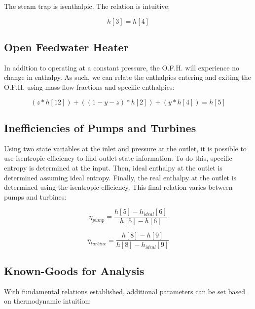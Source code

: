 \documentclass[10pt,cleanfoot]{asme2ej}
\begin{document}
The steam trap is isenthalpic. The relation is intuitive:

\begin{equation}
h[3] = h[4]
\label{Isobaric device}
\end{equation}

\subsection{Open Feedwater Heater}

In addition to operating at a constant pressure, the O.F.H. will experience no change in enthalpy. As such, we can relate the enthalpies entering and exiting the O.F.H. using mass flow fractions and specific enthalpies:

\begin{equation}
(z * h[12]) + ((1-y-z) * h[2]) + (y * h[4]) = h[5]
\label{O.F.H. enthalpies}
\end{equation}

\subsection{Inefficiencies of Pumps and Turbines}

Using two state variables at the inlet and pressure at the outlet, it is possible to use isentropic efficiency to find outlet state information. To do this, specific entropy is determined at the input. Then, ideal enthalpy at the outlet is determined assuming ideal entropy. Finally, the real enthalpy at the outlet is determined using the isentropic efficiency. This final relation varies between pumps and turbines:

\begin{equation}
\eta_{pump} = \frac{h[5] - h_{ideal}[6]}{h[5] - h[6]}
\label{Pump entropy}
\end{equation}

\begin{equation}
\eta_{turbine} = \frac{h[8] - h[9]}{h[8] - h_{ideal}[9]}
\label{Turbine entropy}
\end{equation}

\subsection{Known-Goods for Analysis}

With fundamental relations established, additional parameters can be set based on thermodynamic intuition:
\end{document}
